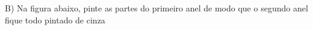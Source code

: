 \documentclass[preview]{standalone}
\begin{document}
\begin{center}
B) Na figura abaixo, pinte as partes do primeiro anel de modo que o segundo anel fique todo pintado de cinza
\end{center}
\end{document}
